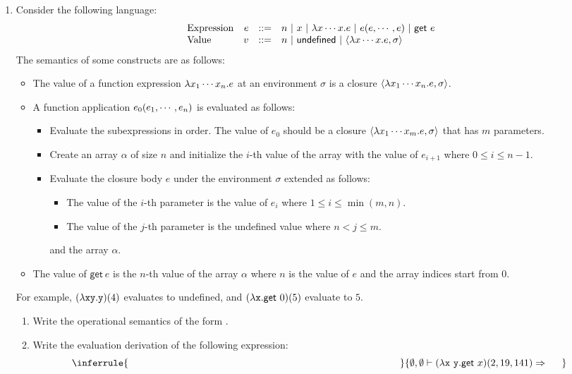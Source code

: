 \begin{enumerate}
\item Consider the following language:
\[
  \begin{array}{lrrl}
  \text{Expression}& e & ::= & n\ |\ x\ |\ \efun{x\cdots x}{e}\ |\
  \eappfo{e}{e,\cdots,e}\ |\ \textsf{get}\ e \\
  \text{Value}& v & ::= & n\ |\ \textsf{undefined}\ |\ \clov{x\cdots x}{e}{\sigma} \\
  \end{array}
\]
The semantics of some constructs are as follows:
\begin{itemize}
  \item The value of a function expression $\lambda x_1\cdots x_n.e$
    at an environment $\sigma$ is a closure $\langle\lambda x_1\cdots x_n.e,\sigma\rangle$.
  \item A function application $e_0(e_1,\cdots,e_n)$ is evaluated as follows:
    \begin{itemize}
      \item Evaluate the subexpressions in order.
        The value of $e_0$ should be a closure
        $\langle\lambda x_1\cdots x_m.e,\sigma\rangle$
        that has $m$ parameters.
      \item Create an array $\alpha$ of size $n$ and
        initialize the $i$-th value of the array with the value of $e_{i+1}$
        where $0 \le i \le n-1$.
      \item Evaluate the closure body $e$ under the environment $\sigma$
        extended as follows:
        \begin{itemize}
          \item The value of the $i$-th parameter is the value of $e_i$
            where $1 \le i \le \min{(m,n)}$.
          \item The value of the $j$-th parameter is the \textsf{undefined}
            value where $n < j \le m$.
        \end{itemize}
        and the array $\alpha$.
    \end{itemize}
  \item The value of $\textsf{get}\ e$ is the $n$-th value of the array $\alpha$
    where $n$ is the value of $e$ and the array indices start from $0$.
\end{itemize}

For example,
$(\lambda\texttt{x}\texttt{y}.\texttt{y})(4)$
evaluates to \textsf{undefined}, and
$(\lambda\texttt{x}.\textsf{get}\ 0)(5)$
evaluate to $5$.

\begin{enumerate}
  \item Write the operational semantics of the form
    .
  \item Write the evaluation derivation of the following expression:
  \[
    \inferrule
    {\hspace*{0.8\textwidth}}
    {\eval{\emptyset,\emptyset}{\eappfo{(\efun{\cx\ \cy}{\textsf{get}\ x})}{2,19,141}}{~~~~~}}
  \]
\end{enumerate}


\end{enumerate}
